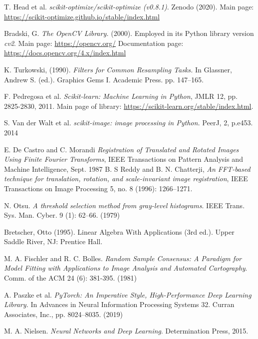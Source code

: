 \documentclass[11pt, a4paper, twoside]{article} %
\begin{document}
\begin{thebibliography}{1}
{
T. Head et al. {\em scikit-optimize/scikit-optimize (v0.8.1)}. Zenodo (2020). Main page: \href{https://scikit-optimize.github.io/stable/index.html}{https://scikit-optimize.github.io/stable/index.html}

Bradski, G. {\em The OpenCV Library.} (2000). Employed in its Python library version {\em cv2}. Main page: \href{https://opencv.org/}{https://opencv.org/} Documentation page: \href{https://docs.opencv.org/4.x/index.html}{https://docs.opencv.org/4.x/index.html}

K. Turkowski, (1990). {\em Filters for Common Resampling Tasks.} In Glassner, Andrew S. (ed.). Graphics Gems I. Academic Press. pp. 147–165.

F. Pedregosa et al. {\em Scikit-learn: Machine Learning in Python}, JMLR 12, pp. 2825-2830, 2011. Main page of library: \href{https://scikit-learn.org/stable/index.html}{https://scikit-learn.org/stable/index.html}.

S. Van der Walt et al. {\em scikit-image: image processing in Python.} PeerJ, 2, p.e453. 2014

E. De Castro and C. Morandi {\em Registration of Translated and Rotated Images Using Finite Fourier Transforms}, IEEE Transactions on Pattern Analysis and Machine Intelligence, Sept. 1987
 B. S Reddy and B. N. Chatterji, {\em An FFT-based technique for translation, rotation, and scale-invariant image registration}, IEEE Transactions on Image Processing 5, no. 8 (1996): 1266–1271.
 
N. Otsu. {\em A threshold selection method from gray-level histograms}. IEEE Trans. Sys. Man. Cyber. 9 (1): 62–66. (1979)

Bretscher, Otto (1995). Linear Algebra With Applications (3rd ed.). Upper Saddle River, NJ: Prentice Hall.


M. A. Fischler and R. C. Bolles. {\em Random Sample Consensus: A Paradigm for Model Fitting with Applications to Image Analysis and Automated Cartography}. Comm. of the ACM 24 (6): 381-395. (1981)

A. Paszke et al. {\em PyTorch: An Imperative Style, High-Performance Deep Learning Library.} In Advances in Neural Information Processing Systems 32. Curran Associates, Inc., pp. 8024–8035. (2019)

M. A. Nielsen. {\em Neural Networks and Deep Learning}. Determination Press, 2015.

}
\end{thebibliography}
\end{document}
